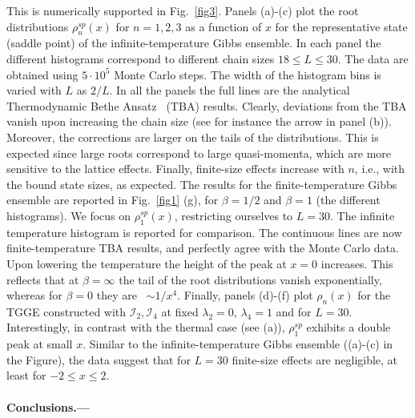 \documentclass[twocolumn,superscriptaddress,prb,10pt]{revtex4-1}
\begin{document}
This is numerically supported in Fig.~\ref{fig3}. Panels (a)-(c) plot the  
root distributions $\rho^{sp}_n(x)$ for $n=1,2,3$ as a function of $x$ for the representative 
state (saddle point) of the infinite-temperature Gibbs ensemble. In each panel 
the different histograms correspond to different chain sizes $18\le L\le 30$. The data 
are obtained using $5\cdot 10^5$ Monte Carlo steps. The width of the histogram bins is 
varied with $L$ as $2/L$. In all the panels the full lines are the analytical   
Thermodynamic Bethe Ansatz~\cite{taka-book} (TBA) results. Clearly, deviations from 
the TBA vanish upon increasing the chain size (see for instance the arrow in panel (b)). 
Moreover, the corrections are larger on the tails of the distributions. This is expected 
since large roots correspond to large quasi-momenta, which are more sensitive to the 
lattice effects. Finally, finite-size effects increase with $n$, i.e., with the bound 
state sizes, as expected. The results for the finite-temperature Gibbs ensemble 
are reported in Fig.~\ref{fig1} (g), for $\beta=1/2$ and $\beta=1$ (the different 
histograms). We focus on $\rho^{sp}_1(x)$, restricting ourselves to $L=30$. The 
infinite temperature histogram is reported for comparison. The continuous lines are now 
finite-temperature TBA results, and perfectly agree with the Monte Carlo data. 
Upon lowering the temperature the height of the peak at $x=0$ increases. This reflects 
that at $\beta=\infty$ the tail of the root distributions vanish exponentially, whereas 
for $\beta=0$ they are~\cite{taka-book} $\sim 1/x^4$. 
Finally, panels (d)-(f) plot $\rho_n(x)$ for the TGGE constructed with ${\mathcal I}_2,
{\mathcal I}_4$ at fixed  $\lambda_2=0$, $\lambda_4=1$ and for $L=30$. Interestingly, 
in contrast with the thermal case (see (a)), $\rho^{sp}_1$ exhibits a double peak 
at small $x$. Similar to the infinite-temperature Gibbs ensemble ((a)-(c) in 
the Figure), the data suggest that for $L=30$ finite-size effects are negligible, 
at least for $-2\le x\le 2$. 


\paragraph*{Conclusions.---}
\end{document}
